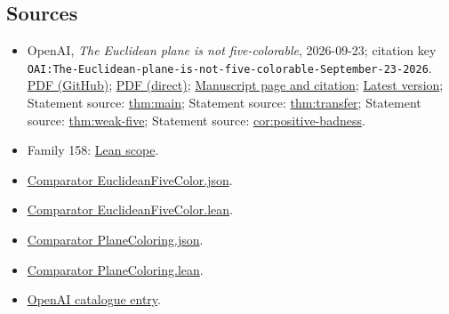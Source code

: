 \documentclass[11pt]{article}
\begin{document}
\subsection{Sources}
\begin{itemize}
\item OpenAI, \emph{The Euclidean plane is not five-colorable}, 2026-09-23; citation key \texttt{OAI:The-Euclidean-plane-is-not-five-colorable-September-23-2026}. \href{https://github.com/openai/math/blob/adc7f1241b42e322a6451854ab7e4b4c146bf78a/preprints/The-Euclidean-plane-is-not-five-colorable-September-23-2026/paper.pdf}{PDF (GitHub)}; \href{https://github.com/openai/math/raw/adc7f1241b42e322a6451854ab7e4b4c146bf78a/preprints/The-Euclidean-plane-is-not-five-colorable-September-23-2026/paper.pdf}{PDF (direct)}; \href{https://github.com/openai/math/blob/adc7f1241b42e322a6451854ab7e4b4c146bf78a/preprints/The-Euclidean-plane-is-not-five-colorable-September-23-2026/README.md}{Manuscript page and citation}; \href{https://github.com/openai/math/blob/main/preprints/The-Euclidean-plane-is-not-five-colorable-September-23-2026/paper.pdf}{Latest version}; Statement source: \href{https://github.com/openai/math/blob/adc7f1241b42e322a6451854ab7e4b4c146bf78a/preprints/The-Euclidean-plane-is-not-five-colorable-September-23-2026/build/sections/introduction.tex\#L62}{thm:main}; Statement source: \href{https://github.com/openai/math/blob/adc7f1241b42e322a6451854ab7e4b4c146bf78a/preprints/The-Euclidean-plane-is-not-five-colorable-September-23-2026/build/sections/introduction.tex\#L104}{thm:transfer}; Statement source: \href{https://github.com/openai/math/blob/adc7f1241b42e322a6451854ab7e4b4c146bf78a/preprints/The-Euclidean-plane-is-not-five-colorable-September-23-2026/build/sections/introduction.tex\#L115}{thm:weak-five}; Statement source: \href{https://github.com/openai/math/blob/adc7f1241b42e322a6451854ab7e4b4c146bf78a/preprints/The-Euclidean-plane-is-not-five-colorable-September-23-2026/build/sections/introduction.tex\#L282}{cor:positive-badness}.
\item Family 158: \href{https://github.com/openai/math/blob/adc7f1241b42e322a6451854ab7e4b4c146bf78a/lean/docs/158.md}{Lean scope}.
\item \href{https://github.com/openai/math/blob/adc7f1241b42e322a6451854ab7e4b4c146bf78a/lean/ComparatorChallenges/EuclideanFiveColor.json}{Comparator EuclideanFiveColor.json}.
\item \href{https://github.com/openai/math/blob/adc7f1241b42e322a6451854ab7e4b4c146bf78a/lean/ComparatorChallenges/EuclideanFiveColor.lean}{Comparator EuclideanFiveColor.lean}.
\item \href{https://github.com/openai/math/blob/adc7f1241b42e322a6451854ab7e4b4c146bf78a/lean/ComparatorChallenges/PlaneColoring.json}{Comparator PlaneColoring.json}.
\item \href{https://github.com/openai/math/blob/adc7f1241b42e322a6451854ab7e4b4c146bf78a/lean/ComparatorChallenges/PlaneColoring.lean}{Comparator PlaneColoring.lean}.
\item \href{https://github.com/openai/math/blob/adc7f1241b42e322a6451854ab7e4b4c146bf78a/CONTENTS.md}{OpenAI catalogue entry}.
\end{itemize}
\end{document}
